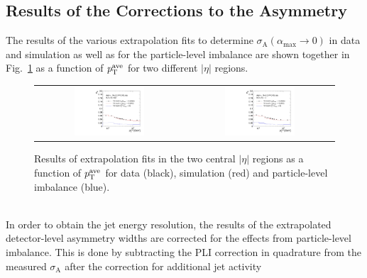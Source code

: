 \subsection{Results of the Corrections to the Asymmetry}
\label{subsec:jer_corrections_results} 
The results of the various extrapolation fits to determine $ \sigma_\mathrm{A}(\alpha_\mathrm{max} \rightarrow 0)$ in data and simulation as well as for the particle-level imbalance are shown together in Fig.~\ref{fig:fit-results} as a function of $p_{\text{T}}^\mathrm{ave}$ for two different $|\eta|$ regions. 
\begin{figure}[!htp]
  \centering
  \begin{tabular}{cc}
                \includegraphics[width=0.49\textwidth]{figures/Extrapol_Eta0_final_nominal_v4b.pdf} &
                \includegraphics[width=0.49\textwidth]{figures/Extrapol_Eta1_final_nominal_v4b.pdf} \\
  \end{tabular}
  \caption{Results of extrapolation fits in the two central $|\eta|$ regions as a function of $p_{\text{T}}^\mathrm{ave}$ for data (black), simulation (red) and particle-level imbalance (blue).}
  \label{fig:fit-results}
\end{figure}
\\
In order to obtain the jet energy resolution, the results of the extrapolated detector-level asymmetry widths are corrected for the effects from particle-level imbalance. This is done by subtracting the PLI correction in quadrature from the measured $\sigma_\mathrm{A}$ after the correction for additional jet activity 
